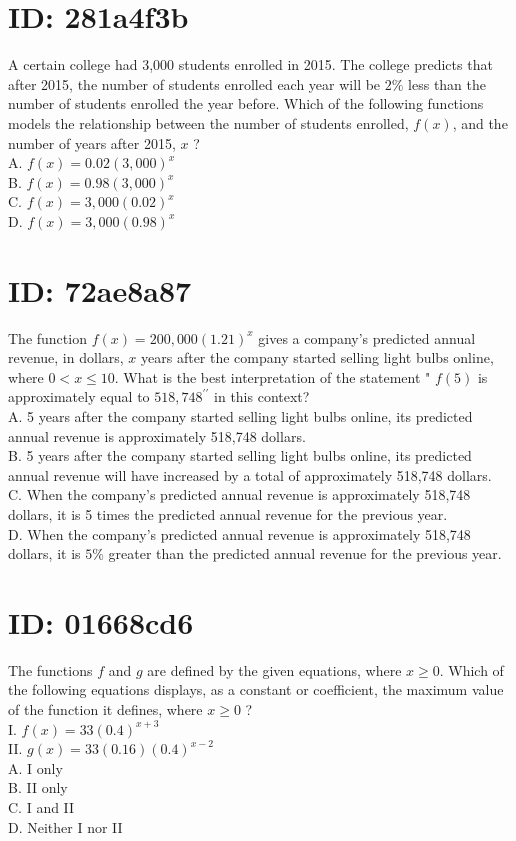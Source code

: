 \section*{ID: 281a4f3b}
A certain college had 3,000 students enrolled in 2015. The college predicts that after 2015, the number of students enrolled each year will be $2 \%$ less than the number of students enrolled the year before. Which of the following functions models the relationship between the number of students enrolled, $f(x)$, and the number of years after 2015, $x$ ?\\
A. $f(x)=0.02(3,000)^{x}$\\
B. $f(x)=0.98(3,000)^{x}$\\
C. $f(x)=3,000(0.02)^{x}$\\
D. $f(x)=3,000(0.98)^{x}$

\section*{ID: 72ae8a87}
The function $f(x)=200,000(1.21)^{x}$ gives a company's predicted annual revenue, in dollars, $x$ years after the company started selling light bulbs online, where $0<x \leq 10$. What is the best interpretation of the statement " $f(5)$ is approximately equal to $518,748^{\prime \prime}$ in this context?\\
A. 5 years after the company started selling light bulbs online, its predicted annual revenue is approximately 518,748 dollars.\\
B. 5 years after the company started selling light bulbs online, its predicted annual revenue will have increased by a total of approximately 518,748 dollars.\\
C. When the company's predicted annual revenue is approximately 518,748 dollars, it is 5 times the predicted annual revenue for the previous year.\\
D. When the company's predicted annual revenue is approximately 518,748 dollars, it is $5 \%$ greater than the predicted annual revenue for the previous year.

\section*{ID: 01668cd6}
The functions $f$ and $g$ are defined by the given equations, where $x \geq 0$. Which of the following equations displays, as a constant or coefficient, the maximum value of the function it defines, where $x \geq 0$ ?\\
I. $f(x)=33(0.4)^{x+3}$\\
II. $g(x)=33(0.16)(0.4)^{x-2}$\\
A. I only\\
B. II only\\
C. I and II\\
D. Neither I nor II

